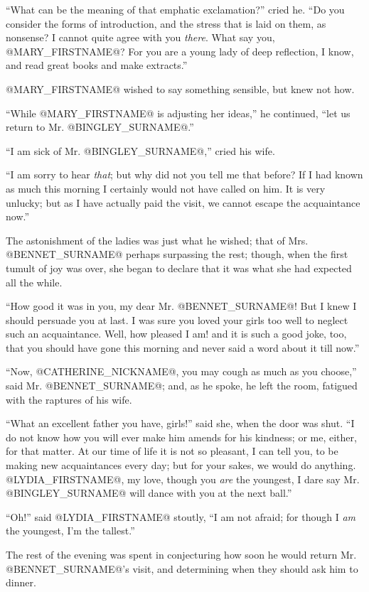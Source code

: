 ``What can be the meaning of that emphatic exclamation?'' cried he. ``Do
you consider the forms of introduction, and the stress that is laid on
them, as nonsense? I cannot quite agree with you \textit{there}. What say you,
@MARY_FIRSTNAME@? For you are a young lady of deep reflection, I know, and read
great books and make extracts.''

@MARY_FIRSTNAME@ wished to say something sensible, but knew not how.

``While @MARY_FIRSTNAME@ is adjusting her ideas,'' he continued, ``let us return to Mr.
@BINGLEY_SURNAME@.''

``I am sick of Mr. @BINGLEY_SURNAME@,'' cried his wife.

``I am sorry to hear \textit{that}; but why did not you tell me that before? If
I had known as much this morning I certainly would not have called
on him. It is very unlucky; but as I have actually paid the visit, we
cannot escape the acquaintance now.''

The astonishment of the ladies was just what he wished; that of Mrs.
@BENNET_SURNAME@ perhaps surpassing the rest; though, when the first tumult of joy
was over, she began to declare that it was what she had expected all the
while.

``How good it was in you, my dear Mr. @BENNET_SURNAME@! But I knew I should
persuade you at last. I was sure you loved your girls too well to
neglect such an acquaintance. Well, how pleased I am! and it is such a
good joke, too, that you should have gone this morning and never said a
word about it till now.''

``Now, @CATHERINE_NICKNAME@, you may cough as much as you choose,'' said Mr. @BENNET_SURNAME@; and,
as he spoke, he left the room, fatigued with the raptures of his wife.

``What an excellent father you have, girls!'' said she, when the door was
shut. ``I do not know how you will ever make him amends for his kindness;
or me, either, for that matter. At our time of life it is not so
pleasant, I can tell you, to be making new acquaintances every day; but
for your sakes, we would do anything. @LYDIA_FIRSTNAME@, my love, though you \textit{are}
the youngest, I dare say Mr. @BINGLEY_SURNAME@ will dance with you at the next
ball.''

``Oh!'' said @LYDIA_FIRSTNAME@ stoutly, ``I am not afraid; for though I \textit{am} the
youngest, I'm the tallest.''

The rest of the evening was spent in conjecturing how soon he would
return Mr. @BENNET_SURNAME@'s visit, and determining when they should ask him to
dinner.



